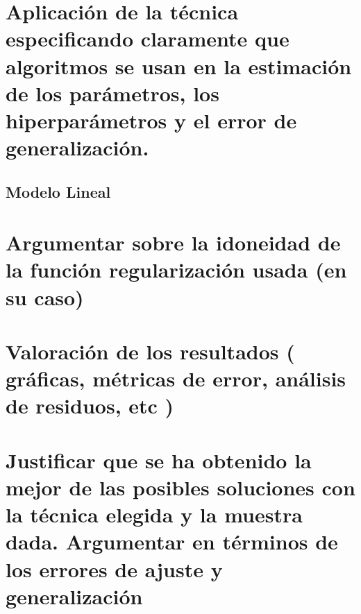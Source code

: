 \documentclass{article}
\begin{document}
	\section{Aplicación de la técnica especificando claramente que algoritmos se usan en la estimación de los parámetros, los hiperparámetros y el error de generalización.} %
	\subsection{Modelo Lineal}
	
	
	\section{Argumentar sobre la idoneidad de la función regularización usada (en su caso)} %
	
	
	
	\section{Valoración de los resultados ( gráficas, métricas de error, análisis de residuos, etc )} %
	
	
	
	\section{Justificar que se ha obtenido la mejor de las posibles soluciones con la técnica elegida y la muestra dada. Argumentar en términos de los errores de ajuste y generalización} %
	
	
	
\end{document}
